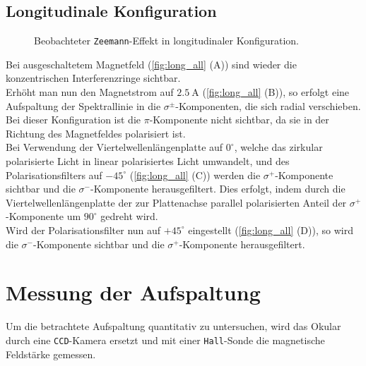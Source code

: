 \subsection{Longitudinale Konfiguration}
\begin{figure}[ht]
    \centering
    \caption{Beobachteter \texttt{Zeemann}-Effekt in longitudinaler Konfiguration.}
\end{figure}
\noindent Bei ausgeschaltetem Magnetfeld (\cref{fig:long_all} (A)) sind wieder die konzentrischen Interferenzringe sichtbar.
\vspace{0.2cm}\\
\noindent Erhöht man nun den Magnetstrom auf $\SI{2,5}{\ampere}$ (\cref{fig:long_all} (B)), so erfolgt eine Aufspaltung der Spektrallinie in die $\sigma^\pm$-Komponenten, die sich radial verschieben. Bei dieser Konfiguration ist die $\pi$-Komponente nicht sichtbar, da sie in der Richtung des Magnetfeldes polarisiert ist.
\vspace{0.2cm}\\
\noindent Bei Verwendung der Viertelwellenlängenplatte auf $0^{\circ}$, welche das zirkular polarisierte Licht in linear polarisiertes Licht umwandelt, und des Polarisationsfilters auf $-45^{\circ}$ (\cref{fig:long_all} (C)) werden die $\sigma^+$-Komponente sichtbar und die $\sigma^-$-Komponente herausgefiltert. Dies erfolgt, indem durch die Viertelwellenlängenplatte der zur Plattenachse parallel polarisierten Anteil der $\sigma^+$-Komponente um $90^{\circ}$ gedreht wird.
\vspace{0.2cm}\\
\noindent Wird der Polarisationsfilter nun auf $+45^{\circ}$ eingestellt (\cref{fig:long_all} (D)), so wird die $\sigma^-$-Komponente sichtbar und die $\sigma^+$-Komponente herausgefiltert.\\
\newpage
\section{Messung der Aufspaltung}
Um die betrachtete Aufspaltung quantitativ zu untersuchen, wird das Okular durch eine \texttt{CCD}-Kamera ersetzt und mit einer \texttt{Hall}-Sonde die magnetische Feldstärke gemessen.
%
%
